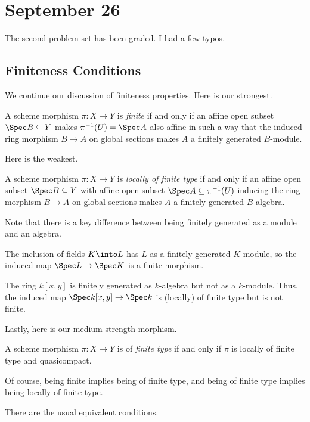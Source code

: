 \documentclass[../notes.tex]{subfiles}
\begin{document}
\section{September 26}

The second problem set has been graded. I had a few typos.

\subsection{Finiteness Conditions}
We continue our discussion of finiteness properties. Here is our strongest.
\begin{definition}[Finite]
	A scheme morphism $\pi\colon X\to Y$ is \textit{finite} if and only if an affine open subset $\Spec B\subseteq Y$ makes $\pi^{-1}(U)=\Spec A$ also affine in such a way that the induced ring morphism $B\to A$ on global sections makes $A$ a finitely generated $B$-module.
\end{definition}
Here is the weakest.
\begin{definition}
	A scheme morphism $\pi\colon X\to Y$ is \textit{locally of finite type} if and only if an affine open subset $\Spec B\subseteq Y$ with affine open subset $\Spec A\subseteq\pi^{-1}(U)$ inducing the ring morphism $B\to A$ on global sections makes $A$ a finitely generated $B$-algebra.
\end{definition}
Note that there is a key difference between being finitely generated as a module and an algebra.
\begin{example}
	The inclusion of fields $K\into L$ has $L$ as a finitely generated $K$-module, so the induced map $\Spec L\to\Spec K$ is a finite morphism.
\end{example}
\begin{example}
	The ring $k[x,y]$ is finitely generated as $k$-algebra but not as a $k$-module. Thus, the induced map $\Spec k[x,y]\to\Spec k$ is (locally) of finite type but is not finite.
\end{example}
Lastly, here is our medium-strength morphism.
\begin{definition}
	A scheme morphism $\pi\colon X\to Y$ is of \textit{finite type} if and only if $\pi$ is locally of finite type and quasicompact.
\end{definition}
\begin{remark}
	Of course, being finite implies being of finite type, and being of finite type implies being locally of finite type.
\end{remark}
There are the usual equivalent conditions.
\end{document}

